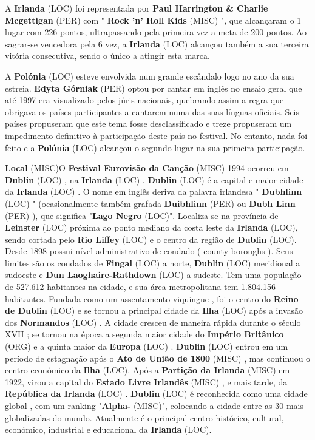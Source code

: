 \documentclass[12pt,a4paper]{article}
\begin{document}
A \textbf{Irlanda} (LOC) foi representada por \textbf{Paul Harrington \& Charlie Mcgettigan} (PER) com " \textbf{Rock 'n' Roll Kids} (MISC) ", que alcançaram o 1 lugar com 226 pontos, ultrapassando pela primeira vez a meta de 200 pontos. Ao sagrar-se vencedora pela 6 vez, a \textbf{Irlanda} (LOC) alcançou também a sua terceira vitória consecutiva, sendo o único a atingir esta marca.

A \textbf{Polónia} (LOC) esteve envolvida num grande escândalo logo no ano da sua estreia. \textbf{Edyta Górniak} (PER) optou por cantar em inglês no ensaio geral que até 1997 era visualizado pelos júris nacionais, quebrando assim a regra que obrigava os países participantes a cantarem numa das suas línguas oficiais. Seis países propuseram que este tema fosse desclassificado e treze propuseram um impedimento definitivo à participação deste país no festival. No entanto, nada foi feito e a \textbf{Polónia} (LOC) alcançou o segundo lugar na sua primeira participação.



\textbf{Local} (MISC)O \textbf{Festival Eurovisão da Canção} (MISC) 1994 ocorreu em \textbf{Dublin} (LOC) , na \textbf{Irlanda} (LOC) . \textbf{Dublin} (LOC) é a capital e maior cidade da \textbf{Irlanda} (LOC) . O nome em inglês deriva da palavra irlandesa " \textbf{Dubhlinn} (LOC) " (ocasionalmente também grafada \textbf{Duibhlinn} (PER) ou \textbf{Dubh Linn} (PER) ), que significa "\textbf{Lago Negro} (LOC)". Localiza-se na província de \textbf{Leinster} (LOC) próxima ao ponto mediano da costa leste da \textbf{Irlanda} (LOC), sendo cortada pelo \textbf{Rio Liffey} (LOC) e o centro da região de \textbf{Dublin} (LOC). Desde 1898 possui nível administrativo de condado ( county-boroughs ). Seus limites são os condados de \textbf{Fingal} (LOC) a norte, \textbf{Dublin} (LOC) meridional a sudoeste e \textbf{Dun Laoghaire-Rathdown} (LOC) a sudeste. Tem uma população de 527.612 habitantes na cidade, e sua área metropolitana tem 1.804.156 habitantes. Fundada como um assentamento viquingue , foi o centro do \textbf{Reino de Dublin} (LOC) e se tornou a principal cidade da \textbf{Ilha} (LOC) após a invasão dos \textbf{Normandos} (LOC) . A cidade cresceu de maneira rápida durante o século XVII ; se tornou na época a segunda maior cidade do \textbf{Império Britânico} (ORG) e a quinta maior da \textbf{Europa} (LOC) . \textbf{Dublin} (LOC) entrou em um período de estagnação após o \textbf{Ato de União de 1800} (MISC) , mas continuou o centro económico da \textbf{Ilha} (LOC). Após a \textbf{Partição da Irlanda} (MISC) em 1922, virou a capital do \textbf{Estado Livre Irlandês} (MISC) , e mais tarde, da \textbf{República da Irlanda} (LOC) . \textbf{Dublin} (LOC) é reconhecida como uma cidade global , com um ranking "\textbf{Alpha-} (MISC)", colocando a cidade entre as 30 mais globalizadas do mundo. Atualmente é o principal centro histórico, cultural, económico, industrial e educacional da \textbf{Irlanda} (LOC).
\end{document}
